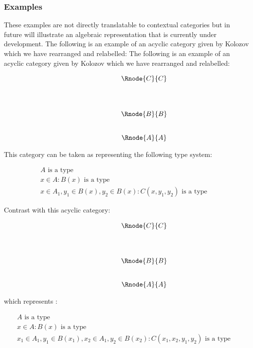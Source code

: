 \documentclass[10pt,a4paper]{scrartcl}
\begin{document}
\subsubsection{Examples}
These examples are not directly translatable to contextual categories but 
in future will illustrate an algebraic representation that is currently under development.
\noindent
The following is an example of an acyclic category given by Kolozov which we have rearranged and relabelled:
\noindent
The following is an example of an acyclic category given by Kolozov which we have rearranged and relabelled:

\begin{center}
\begin{equation}
\begin{array}{p{1.5cm}cccp{2cm}c}
&                & \Rnode{C}{C}&   \\ [1.4cm]
&                & \Rnode{B}{B} &  \\ [0.8cm]
&                & \Rnode{A}{A} &  
\end{array}
\end{equation}
\setlength {\saroffsetA}{-2pt}
\setlength {\saroffsetB}{-2pt}
\sarreset
\end{center}

\noindent This category can be taken as representing the following type system:
\addtocounter{equation}{-1}
\begin{align}
&A\mbox{ is a type} && \tag*{(\theequation a)}\\
&x\in A: B(x) \mbox{ is a type} && \tag*{(\theequation b)}\\
&x\in A_1, y_1 \in B(x), y_2 \in B(x) : C(x,y_1,y_2) \mbox{ is a type} && \tag*{(\theequation c)}
\end{align}

\noindent
Contrast with this acyclic category:
\begin{center}
\begin{equation}
\begin{array}{p{1.5cm}cccp{2cm}c}
&                & \Rnode{C}{C}&   \\ [1.4cm]
&                & \Rnode{B}{B} &  \\ [0.8cm]
&                & \Rnode{A}{A} &  
\end{array}
\end{equation}
\setlength {\saroffsetA}{-2pt}
\setlength {\saroffsetB}{-2pt}
\setlength {\saroffsetA}{2pt}
\setlength {\saroffsetB}{2pt}
\sarreset
\end{center}
\noindent
which represents :
\addtocounter{equation}{-1}
\begin{align}
&A\mbox{ is a type} && \tag*{(\theequation a)}\\
&x\in A: B(x) \mbox{ is a type} && \tag*{(\theequation b)}\\
&x_1\in A_1, y_1 \in B(x_1), x_2\in A_1, y_2 \in B(x_2) : C(x_1,x_2,y_1,y_2) \mbox{ is a type} && \tag*{(\theequation c)}
\end{align}
\end{document}
